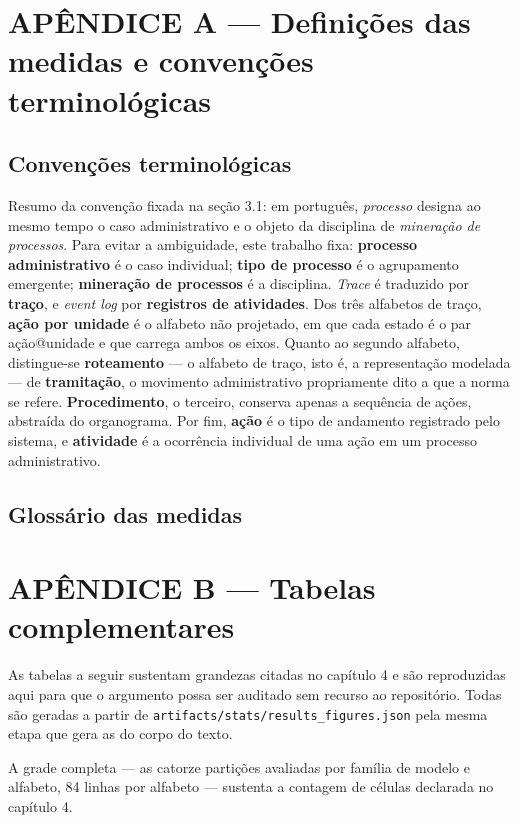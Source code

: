 \newpage
\section*{APÊNDICE A --- Definições das medidas e convenções terminológicas}

\subsection*{Convenções terminológicas}

Resumo da convenção fixada na seção 3.1: em português, \emph{processo} designa ao mesmo tempo o
caso administrativo e o objeto da disciplina de \emph{mineração de processos}. Para evitar a
ambiguidade, este trabalho fixa: \textbf{processo administrativo} é o caso individual;
\textbf{tipo de processo} é o agrupamento emergente; \textbf{mineração de processos} é a
disciplina. \emph{Trace} é traduzido por \textbf{traço}, e \emph{event log} por \textbf{registros
de atividades}. Dos três alfabetos de traço, \textbf{ação por unidade} é o alfabeto não projetado, em que
cada estado é o par ação@unidade e que carrega ambos os eixos. Quanto ao segundo alfabeto,
distingue-se \textbf{roteamento} --- o alfabeto de traço, isto é, a representação modelada --- de
\textbf{tramitação}, o movimento administrativo propriamente dito a que a norma se refere.
\textbf{Procedimento}, o terceiro, conserva apenas a sequência de ações, abstraída do organograma.
Por fim, \textbf{ação} é o tipo de andamento registrado pelo sistema, e \textbf{atividade} é a
ocorrência individual de uma ação em um processo administrativo.

\subsection*{Glossário das medidas}



\newpage
\section*{APÊNDICE B --- Tabelas complementares}

As tabelas a seguir sustentam grandezas citadas no capítulo 4 e são reproduzidas aqui para que o
argumento possa ser auditado sem recurso ao repositório. Todas são geradas a partir de
\texttt{artifacts/stats/results\_figures.json} pela mesma etapa que gera as do corpo do texto.










A grade completa --- as catorze partições avaliadas por família de modelo e alfabeto, 84 linhas
por alfabeto --- sustenta a contagem de células declarada no capítulo 4.


